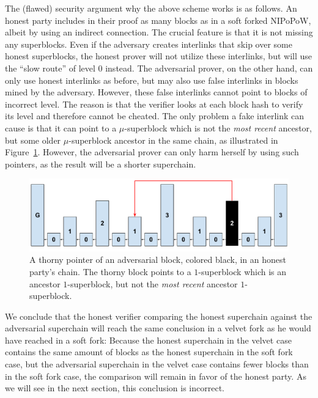 The (flawed) security argument why the above scheme works is as follows. 
An honest party
includes in their proof as many blocks as in a soft forked NIPoPoW, albeit by
using an indirect connection. The crucial feature is that it is not missing any
superblocks. Even if the adversary creates interlinks that skip over some honest
superblocks, the honest prover will not utilize these interlinks, but will use
the ``slow route'' of level $0$ instead. The adversarial prover, on the other
hand, can only use honest interlinks as before, but may also use false
interlinks in blocks mined by the adversary. However, these false
interlinks cannot point to blocks of incorrect level. The reason is
that the verifier looks at each block hash to verify its level and
therefore cannot be cheated. The only problem a fake interlink can cause is that
it can point to a $\mu$-superblock which is not the \emph{most recent} ancestor,
but some older $\mu$-superblock ancestor in the same chain,
as illustrated in Figure~\ref{fig:skip_ancestor}. However, the adversarial
prover can only harm herself by using such pointers, as the result will
be a shorter superchain.

\begin{figure}
	\begin{center}
		\includegraphics[width=0.8\columnwidth]{figures/simple_thorny.pdf}
	\end{center}
    \caption{A thorny pointer of an adversarial block, colored black, in an honest party's chain. The thorny block points to a $1$-superblock which is an ancestor
		$1$-superblock, but not the \emph{most recent} ancestor $1$-superblock.}
	\label{fig:skip_ancestor}
\end{figure}

We conclude that the honest verifier comparing the honest superchain
against the adversarial superchain will reach the same conclusion in a velvet
fork as he would have reached in a soft fork: Because the honest
superchain in the velvet case contains the same amount of blocks as the honest
superchain in the soft fork case, but the adversarial superchain in the velvet
case contains fewer blocks than in the soft fork case, the comparison will
remain in favor of the honest party. As we will see in the next section, this
conclusion is incorrect.
